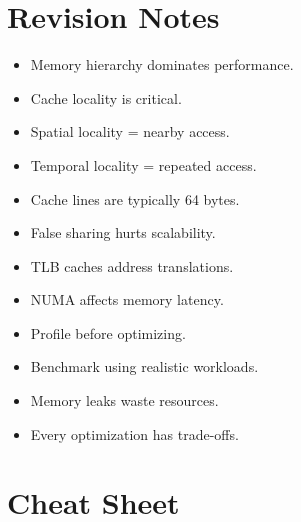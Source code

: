 \section{Revision Notes}

\begin{itemize}
\item Memory hierarchy dominates performance.
\item Cache locality is critical.
\item Spatial locality = nearby access.
\item Temporal locality = repeated access.
\item Cache lines are typically 64 bytes.
\item False sharing hurts scalability.
\item TLB caches address translations.
\item NUMA affects memory latency.
\item Profile before optimizing.
\item Benchmark using realistic workloads.
\item Memory leaks waste resources.
\item Every optimization has trade-offs.
\end{itemize}

\section{Cheat Sheet}

